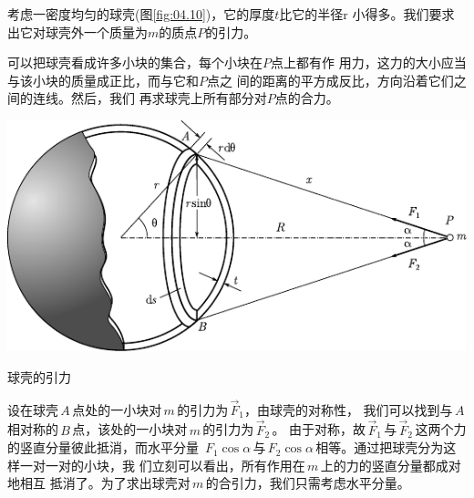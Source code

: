 考虑一密度均匀的球壳(图\ref{fig:04.10})，它的厚度$ t $比它的半径$  $r
小得多。我们要求出它对球壳外一个质量为$ m $的质点$ P $的引力。

可以把球壳看成许多小块的集合，每个小块在$ P $点上都有作
用力，这力的大小应当与该小块的质量成正比，而与它和$ P $点之
间的距离的平方成反比，方向沿着它们之间的连线。然后，我们
再求球壳上所有部分对$ P $点的合力。
\begin{figurex}
 \centering
 \includegraphics{figure/fig04.10}
 \caption{球壳的引力}
 \label{fig:04.10}
\end{figurex}\vspace{-0.5em}

设在球壳\,$ A $\,点处的一小块对\,$ m $\,的引力为\,$ \vec{F} _ { 1 } $，由球壳的对称性，
我们可以找到与\,$ A $\,相对称的\,$ B $\,点，该处的一小块对\,$ m $\,的引力为\,$ \vec{F} _ { 2 } $\,。
由于对称，故\,$ \vec{F} _ { 1 } $\,与\,$ \vec{F} _ { 2 } $\,这两个力的竖直分量彼此抵消，而水平分量
\,$ F _ { 1 } \cos \alpha $\,与\,$ F _ { 2 } \cos \alpha $\,相等。通过把球壳分为这样一对一对的小块，我
们立刻可以看出，所有作用在\,$ m $\,上的力的竖直分量都成对地相互
抵消了。为了求出球壳对\,$ m $\,的合引力，我们只需考虑水平分量。

